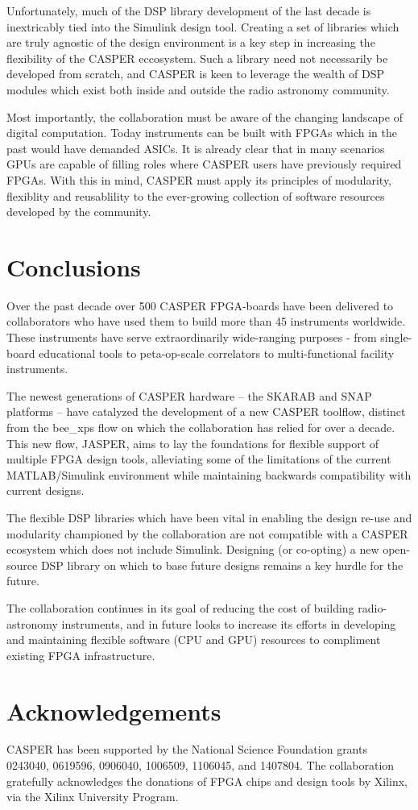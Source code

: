 \documentclass{ws-jai}
\begin{document}
Unfortunately, much of the DSP library development of the last decade is inextricably tied into the Simulink design tool. Creating a set of libraries which are truly agnostic of the design environment is a key step in increasing the flexibility of the CASPER eccosystem. Such a library need not necessarily be developed from scratch, and CASPER is keen to leverage the wealth of DSP modules which exist both inside and outside the radio astronomy community.

Most importantly, the collaboration must be aware of the changing landscape of digital computation. Today instruments can be built with FPGAs which in the past would have demanded ASICs. It is already clear that in many scenarios GPUs are capable of filling roles where CASPER users have previously required FPGAs. With this in mind, CASPER must apply its principles of modularity, flexiblity and reusablility to the ever-growing collection of software resources developed by the community.

\section{Conclusions} \label{sec:Conclusions}
Over the past decade over 500 CASPER FPGA-boards have been delivered to collaborators who have used them to build more than 45 instruments worldwide. These instruments have serve extraordinarily wide-ranging purposes - from single-board educational tools to peta-op-scale correlators to multi-functional facility instruments.

The newest generations of CASPER hardware -- the SKARAB and SNAP platforms -- have catalyzed the development of a new CASPER toolflow, distinct from the bee\_xps flow on which the collaboration has relied for over a decade. This new flow, JASPER, aims to lay the foundations for flexible support of multiple FPGA design tools, alleviating some of the limitations of the current MATLAB/Simulink environment while maintaining backwards compatibility with current designs.

The flexible DSP libraries which have been vital in enabling the design re-use and modularity championed by the collaboration are not compatible with a CASPER ecosystem which does not include Simulink. Designing (or co-opting) a new open-source DSP library on which to base future designs remains a key hurdle for the future.

The collaboration continues in its goal of reducing the cost of building radio-astronomy instruments, and in future looks to increase its efforts in developing and maintaining flexible software (CPU and GPU) resources to compliment existing FPGA infrastructure.

\section{Acknowledgements}
CASPER has been supported by the National Science Foundation grants 0243040,  0619596,  0906040,  1006509,  1106045, and 1407804. The collaboration gratefully acknowledges the donations of FPGA chips and design tools by Xilinx, via the Xilinx University Program.





\end{document}

